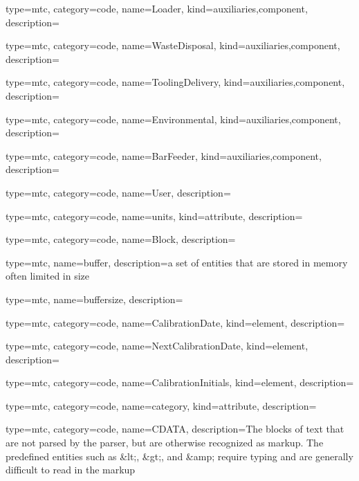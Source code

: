 {
  type=mtc,
  category=code,
  name={Loader},
  kind={auxiliaries,component},
  description={}
}


{
  type=mtc,
  category=code,
  name={WasteDisposal},
  kind={auxiliaries,component},
  description={}
}


{
  type=mtc,
  category=code,
  name={ToolingDelivery},
  kind={auxiliaries,component},
  description={}
}


{
  type=mtc,
  category=code,
  name={Environmental},
  kind={auxiliaries,component},
  description={}
}


{
  type=mtc,
  category=code,
  name={BarFeeder},
  kind={auxiliaries,component},
  description={}
}


{
  type=mtc,
  category=code,
  name={User},
  description={}
}


{
  type=mtc,
  category=code,
  name={units},
  kind={attribute},
  description={}
}


{
  type=mtc,
  category=code,
  name={Block},
  description={}
}


{
  type=mtc,
  name=buffer,
  description={a set of entities that are stored in memory often limited in size}
}


{
  type=mtc,
  name=buffersize,
  description={}
}


{
  type=mtc,
  category=code,
  name={CalibrationDate},
  kind={element},
  description={}
}


{
  type=mtc,
  category=code,
  name={NextCalibrationDate},
  kind={element},
  description={}
}


{
  type=mtc,
  category=code,
  name={CalibrationInitials},
  kind={element},
  description={}
}


{
  type=mtc,
  category=code,
  name={category},
  kind={attribute},
  description={}
}


{
  type=mtc,
  category=code,
  name=CDATA,
  description={The blocks of text that are not parsed by the parser, but are otherwise recognized as markup. The predefined entities such as \&lt;, \&gt;, and \&amp; require typing and are generally difficult to read in the markup}
}


